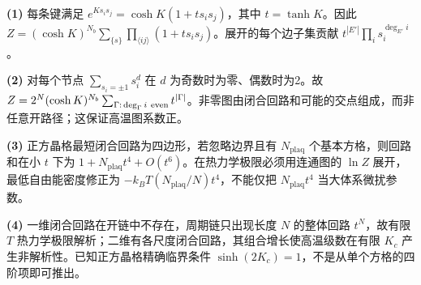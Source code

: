 \par\noindent\textbf{(1)} 每条键满足 \(e^{Ks_is_j}=\cosh K(1+t s_is_j)\)，其中 \(t=\tanh K\)。因此 \(Z=(\cosh K)^{N_b}\sum_{\{s\}}\prod_{\langle ij\rangle}(1+t s_is_j)\)。展开的每个边子集贡献 \(t^{|E'|}\prod_i s_i^{\deg_{E'}i}\)。
\par\noindent\textbf{(2)} 对每个节点 \(\sum_{s_i=\pm1}s_i^d\) 在 \(d\) 为奇数时为零、偶数时为2。故 \(Z=2^N(\cosh K)^{N_b}\sum_{\Gamma:\,\deg_\Gamma i\ {\rm even}}t^{|\Gamma|}\)。非零图由闭合回路和可能的交点组成，而非任意开路径；这保证高温图系数正。
\par\noindent\textbf{(3)} 正方晶格最短闭合回路为四边形，若忽略边界且有 \(N_\mathrm{plaq}\) 个基本方格，则回路和在小 \(t\) 下为 \(1+N_\mathrm{plaq} t^4+O(t^6)\)。在热力学极限必须用连通图的 \(\ln Z\) 展开，最低自由能密度修正为 \(-k_BT(N_\mathrm{plaq}/N)t^4\)，不能仅把 \(N_\mathrm{plaq} t^4\) 当大体系微扰参数。
\par\noindent\textbf{(4)} 一维闭合回路在开链中不存在，周期链只出现长度 \(N\) 的整体回路 \(t^N\)，故有限 \(T\) 热力学极限解析；二维有各尺度闭合回路，其组合增长使高温级数在有限 \(K_c\) 产生非解析性。已知正方晶格精确临界条件 \(\sinh(2K_c)=1\)，不是从单个方格的四阶项即可推出。
